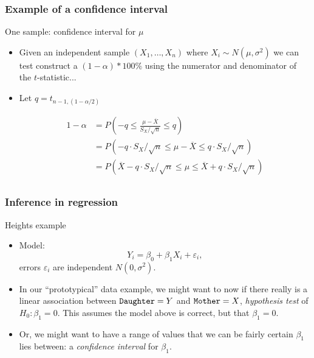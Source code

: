 \documentclass[handout]{beamer}
\begin{document}

   \begin{frame} \frametitle{Example of a confidence interval}

   \begin{block}
   {One sample: confidence interval for $\mu$}
   \begin{itemize}[<+->]

   \item Given an independent sample $(X_1, \dots, X_n)$ where
   $X_i\sim N(\mu,\sigma^2)$ we can test construct
   a $(1-\alpha)*100\%$ using the
   numerator and denominator of the $t$-statistic...

   \item Let $q=t_{n-1,(1-\alpha/2)}$

   $$
   \begin{aligned}
   1 - \alpha &= P\left(-q \leq \frac{\mu - \overline{X}}
   {S_X / \sqrt{n}} \leq q \right) \\
   &= P\left(-q \cdot {S_X / \sqrt{n}} \leq {\mu - \overline{X}}
   \leq q  \cdot {S_X / \sqrt{n}} \right) \\
   &= P\left(\overline{X} - q  \cdot {S_X / \sqrt{n}}
   \leq {\mu} \leq \overline{X} + q  \cdot {S_X / \sqrt{n}} \right) \\
   \end{aligned}
   $$

   \end{itemize}
   \end{block}
   \end{frame}


   \begin{frame} \frametitle{Inference in regression}

   \begin{block}
   {Heights example}
   \begin{itemize}

   \item Model:
   $$
   Y_i = \beta_0 + \beta_1 X_i + \varepsilon_i,$$
   errors $\varepsilon_i$ are independent $N(0, \sigma^2)$.
   \item In our ``prototypical'' data example, we might want to now if there
   really is a linear association between ${\tt Daughter}=Y$
   and ${\tt Mother}=X$, {\em hypothesis test} of $H_0:\beta_1=0$.
   This assumes the model above is correct, but that $\beta_1=0$.

   \item Or, we might want to have a range of values that we can be fairly certain $\beta_1$ lies between: a {\em confidence interval} for $\beta_1$.
   \end{itemize}
   \end{block}
   \end{frame}
\end{document}
